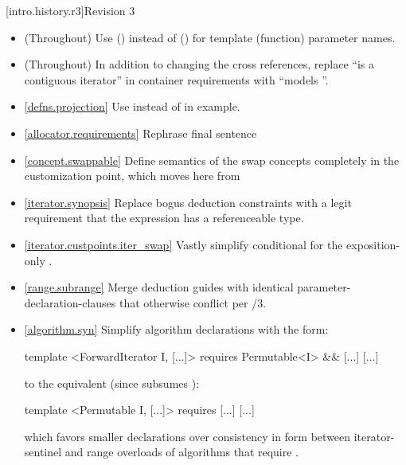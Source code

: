 [intro.history.r3]{Revision 3}
\begin{itemize}
\item (Throughout) Use  () instead of  () for
   template (function) parameter names.
\item (Throughout) In addition to changing the cross references, replace
  ``is a contiguous iterator'' in container requirements with ``models
  ''.
\item \ref{defns.projection} Use  instead of 
  in example.
\item \ref{allocator.requirements} Rephrase final sentence
\item \ref{concept.swappable} Define semantics of the swap concepts completely in
  the  customization point, which moves here from 
\item \ref{iterator.synopsis} Replace bogus 
  deduction constraints with a legit requirement that the expression has
  a referenceable type.
\item \ref{iterator.custpoints.iter_swap} Vastly simplify conditional
   for the exposition-only .
\item \ref{range.subrange} Merge  deduction guides with identical
  parameter-declaration-clauses that otherwise conflict per
  /3.
\item \ref{algorithm.syn} Simplify algorithm declarations with the form:
\begin{codeblock}
template <ForwardIterator I, [...]>
  requires Permutable<I> && [...]
[...]
\end{codeblock}
to the equivalent (since  subsumes ):
\begin{codeblock}
template <Permutable I, [...]>
  requires [...]
[...]
\end{codeblock}
which favors smaller declarations over consistency in form between
iterator-sentinel and range overloads of algorithms that require
.
\end{itemize}

